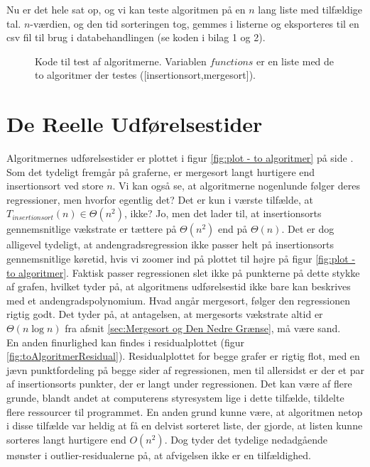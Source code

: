 Nu er det hele sat op, og vi kan teste algoritmen på en $n$ lang liste med tilfældige tal. $n$-værdien, og den tid sorteringen tog, gemmes i listerne og eksporteres til en csv fil til brug i databehandlingen (se koden i bilag 1 og 2).

\begin{figure}
	\begin{center}
		
	\end{center}
	\caption{Kode til test af algoritmerne. Variablen $functions$ er en liste med de to algoritmer der testes ([insertionsort,mergesort]).}
	\label{fig:Kode til test af algoritmerne}
\end{figure}



\section{De Reelle Udførelsestider}
\label{sec:De Reelle Køretider}

Algoritmernes udførelsestider er plottet i figur \ref{fig:plot - to algoritmer} på side \pageref{fig:plot - to algoritmer}.\\

Som det tydeligt fremgår på graferne, er mergesort langt hurtigere end insertionsort ved store $n$. Vi kan også se, at algoritmerne nogenlunde følger deres regressioner, men hvorfor egentlig det? Det er kun i værste tilfælde, at $T_{insertionsort}(n) \in \Theta (n^2)$, ikke? Jo, men det lader til, at insertionsorts gennemsnitlige vækstrate er tættere på $\Theta (n^2)$ end på $\Theta (n)$. Det er dog alligevel tydeligt, at andengradsregression ikke passer helt på insertionsorts gennemsnitlige køretid, hvis vi zoomer ind på plottet til højre på figur \ref{fig:plot - to algoritmer}. Faktisk passer regressionen slet ikke på punkterne på dette stykke af grafen, hvilket tyder på, at algoritmens udførelsestid ikke bare kan beskrives med et andengradspolynomium. Hvad angår mergesort, følger den regressionen rigtig godt. Det tyder på, at antagelsen, at mergesorts vækstrate altid er $\Theta (n \log n)$ fra afsnit \ref{sec:Mergesort og Den Nedre Grænse}, må være sand.\\

En anden finurlighed kan findes i residualplottet (figur \ref{fig:toAlgoritmerResidual}). Residualplottet for begge grafer er rigtig flot, med en jævn punktfordeling på begge sider af regressionen, men til allersidst er der et par af insertionsorts punkter, der er langt under regressionen. Det kan være af flere grunde, blandt andet at computerens styresystem lige i dette tilfælde, tildelte flere ressourcer til programmet. En anden grund kunne være, at algoritmen netop i disse tilfælde var heldig at få en delvist sorteret liste, der gjorde, at listen kunne sorteres langt hurtigere end $O(n^2)$. Dog tyder det tydelige nedadgående mønster i outlier-residualerne på, at afvigelsen ikke er en tilfældighed.\\

